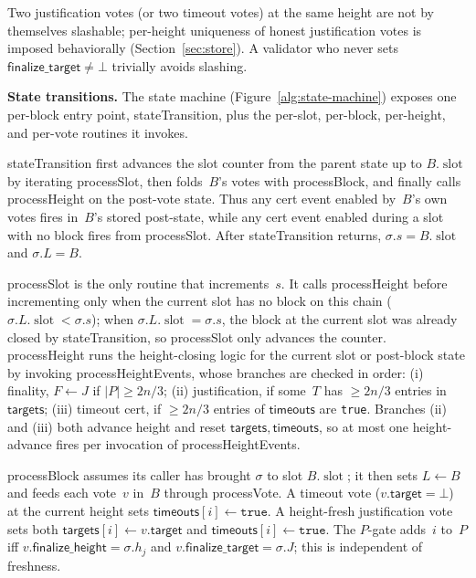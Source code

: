 \ifx\litemode\undefined\documentclass{article}\fi
\newcommand{\slot}[0]{\ensuremath{\operatorname{\mathrm{slot}}}}
\newcommand{\target}{\mathsf{target}}
\newcommand{\finalizeHeight}{\mathsf{finalize\_height}}
\newcommand{\finalizeTarget}{\mathsf{finalize\_target}}
\newcommand{\targets}{\mathsf{targets}}
\newcommand{\timeouts}{\mathsf{timeouts}}
\newcommand{\stateTransition}{\textsf{stateTransition}\xspace}
\newcommand{\processSlot}{\textsf{processSlot}\xspace}
\newcommand{\processBlock}{\textsf{processBlock}\xspace}
\newcommand{\processHeight}{\textsf{processHeight}\xspace}
\newcommand{\processHeightEvents}{\textsf{processHeightEvents}\xspace}
\newcommand{\processVote}{\textsf{processVote}\xspace}
\renewcommand{\paragraph}[1]{\vspace{7pt}\noindent\textbf{#1}}
\theoremstyle{plain}
\theoremstyle{definition}
\theoremstyle{remark}
\begin{document}
Two justification votes (or two timeout votes) at the same height are not by themselves slashable; per-height uniqueness of honest justification votes is imposed behaviorally (Section~\ref{sec:store}).
A validator who never sets $\finalizeTarget \neq \bot$ trivially avoids slashing.

\paragraph{State transitions.}
The state machine (Figure~\ref{alg:state-machine}) exposes one per-block entry point, \stateTransition, plus the per-slot, per-block, per-height, and per-vote routines it invokes.

\stateTransition first advances the slot counter from the parent state up to $B.\slot$ by iterating \processSlot, then folds~$B$'s votes with \processBlock, and finally calls \processHeight on the post-vote state.
Thus any cert event enabled by~$B$'s own votes fires in~$B$'s stored post-state, while any cert event enabled during a slot with no block fires from \processSlot.
After \stateTransition{} returns, $\sigma.s = B.\slot$ and $\sigma.L = B$.

\processSlot is the only routine that increments~$s$.
It calls \processHeight before incrementing only when the current slot has no block on this chain ($\sigma.L.\slot < \sigma.s$); when $\sigma.L.\slot = \sigma.s$, the block at the current slot was already closed by \stateTransition, so \processSlot only advances the counter.
\processHeight runs the height-closing logic for the current slot or post-block state by invoking \processHeightEvents, whose branches are checked in order: (i) finality, $F \gets J$ if $|P| \geq 2n/3$; (ii) justification, if some~$T$ has $\geq 2n/3$ entries in $\targets$; (iii) timeout cert, if $\geq 2n/3$ entries of $\timeouts$ are \texttt{true}.
Branches (ii) and (iii) both advance height and reset $\targets, \timeouts$, so at most one height-advance fires per invocation of \processHeightEvents.

\processBlock assumes its caller has brought $\sigma$ to slot $B.\slot$; it then sets $L \gets B$ and feeds each vote~$v$ in~$B$ through \processVote.
A timeout vote ($v.\target = \bot$) at the current height sets $\timeouts[i] \gets \mathtt{true}$.
A height-fresh justification vote sets both $\targets[i] \gets v.\target$ and $\timeouts[i] \gets \mathtt{true}$.
The $P$-gate adds~$i$ to~$P$ iff $v.\finalizeHeight = \sigma.h_j$ and $v.\finalizeTarget = \sigma.J$; this is independent of freshness.
\end{document}
